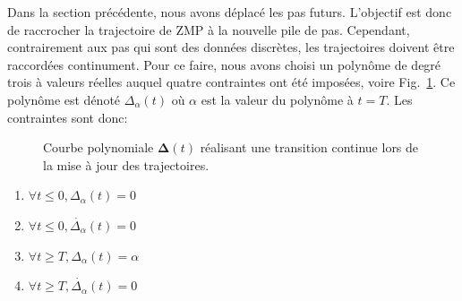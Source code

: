 Dans la section précédente, nous avons déplacé les pas
futurs. L'objectif est donc de raccrocher la trajectoire de ZMP à la
nouvelle pile de pas. Cependant, contrairement aux pas qui sont des
données discrètes, les trajectoires doivent être raccordées
continument. Pour ce faire, nous avons choisi un polynôme de degré
trois à valeurs réelles auquel quatre contraintes ont été imposées,
voire Fig. \ref{fig:transition}. Ce polynôme est dénoté
$\Delta_\alpha(t)$ où $\alpha$ est la valeur du polynôme à $t=T$. Les
contraintes sont donc:

\begin{figure}[ht!]
  \begin{center}

  \end{center}
  \caption{Courbe polynomiale $\mathbf{\Delta}(t)$ réalisant une
    transition continue lors de la mise à jour des
    trajectoires. \label{fig:transition}}
\end{figure}

\begin{enumerate}
\item $\forall t \leq 0, \Delta_\alpha(t) = 0$
\item $\forall t \leq 0, \dot{\Delta_\alpha}(t) = 0$
\item $\forall t \geq T, \Delta_\alpha(t) = \alpha$
\item $\forall t \geq T, \dot{\Delta_\alpha}(t) = 0$
\end{enumerate}

